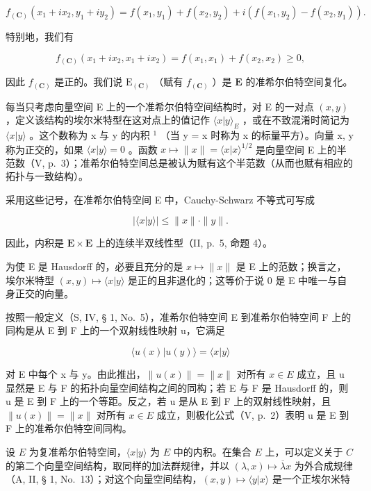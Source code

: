 \[
f _ {(\mathbf {C})} \left(x _ {1} + i x _ {2}, y _ {1} + i y _ {2}\right) = f \left(x _ {1}, y _ {1}\right) + f \left(x _ {2}, y _ {2}\right) + i \left(f \left(x _ {1}, y _ {2}\right) - f \left(x _ {2}, y _ {1}\right)\right).
\]

特别地，我们有

\[
f _ {(\mathbf {C})} (x _ {1} + i x _ {2}, x _ {1} + i x _ {2}) = f (x _ {1}, x _ {1}) + f (x _ {2}, x _ {2}) \geqslant 0,
\]

因此 \(f_{(\mathbf{C})}\) 是正的。我们说 \(\mathrm{E}_{(\mathbf{C})}\) （赋有 \(f_{(\mathbf{C})}\) ）是 \(\mathbf{E}\) 的准希尔伯特空间复化。

每当只考虑向量空间 E 上的一个准希尔伯特空间结构时，对 E 的一对点 \((x, y)\) ，定义该结构的埃尔米特型在这对点上的值记作 \(\langle x|y\rangle_{E}\) ，或在不致混淆时简记为 \(\langle x|y\rangle\) 。这个数称为 x 与 y 的内积 \(^{1}\) （当 y = x 时称为 x 的标量平方）。向量 x, y 称为正交的，如果 \(\langle x|y\rangle = 0\) 。函数 \(x \mapsto \|x\| = \langle x|x\rangle^{1/2}\) 是向量空间 E 上的半范数（V, p.~3）；准希尔伯特空间总是被认为赋有这个半范数（从而也赋有相应的拓扑与一致结构）。

采用这些记号，在准希尔伯特空间 E 中，Cauchy-Schwarz 不等式可写成

\[
\left| \langle x | y \rangle \right| \leqslant \| x \|\cdot \| y \|.\tag{9}
\]

因此，内积是 \(\mathbf{E} \times \mathbf{E}\) 上的连续半双线性型（II, p.~5, 命题 4）。

为使 E 是 Hausdorff 的，必要且充分的是 \(x \mapsto \|x\|\) 是 E 上的范数；换言之，埃尔米特型 \((x, y) \mapsto \langle x | y \rangle\) 是正的且非退化的；这等价于说 0 是 E 中唯一与自身正交的向量。

按照一般定义（S, IV, § 1, No.~5），准希尔伯特空间 E 到准希尔伯特空间 F 上的同构是从 E 到 F 上的一个双射线性映射 u，它满足

\[
\langle u (x) | u (y) \rangle = \langle x | y \rangle\tag{10}
\]

对 E 中每个 x 与 y。由此推出，\(\|u(x)\| = \|x\|\) 对所有 \(x \in E\) 成立，且 u 显然是 E 与 F 的拓扑向量空间结构之间的同构；若 E 与 F 是 Hausdorff 的，则 u 是 E 到 F 上的一个等距。反之，若 u 是从 E 到 F 上的双射线性映射，且 \(\|u(x)\| = \|x\|\) 对所有 \(x \in E\) 成立，则极化公式（V, p.~2）表明 u 是 E 到 F 上的准希尔伯特空间同构。

设 \(E\) 为复准希尔伯特空间，\(\langle x|y\rangle\) 为 \(E\) 中的内积。在集合 \(E\) 上，可以定义关于 \(C\) 的第二个向量空间结构，取同样的加法群规律，并以 \((\lambda, x) \mapsto \overline{\lambda}x\) 为外合成规律（A, II, § 1, No.~13）；对这个向量空间结构，\((x, y) \mapsto \langle y|x\rangle\) 是一个正埃尔米特

